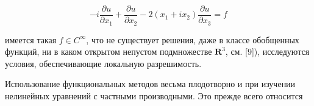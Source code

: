 \documentclass[10pt]{article}
\begin{document}
\[

-i \frac{\partial u}{\partial x_{1}}+\frac{\partial u}{\partial x_{2}}-2\left(x_{1}+i x_{2}\right) \frac{\partial u}{\partial x_{3}}=f

\]



имеется такая $f \in C^{\infty}$, что не существует решения, даже в классе обобщенных функций, ни в каком открытом непустом подмножестве $\boldsymbol{R}^{3}$, см. [9]), исследуются условия, обеспечивающие локальную разрешимость.



Использование функциональных методов весьма плодотворно и при изучении нелинейных уравнений с частными производными. Это прежде всего относится
\end{document}
